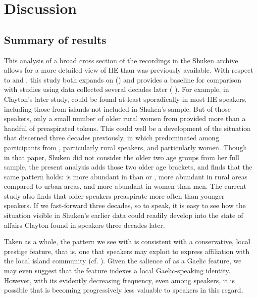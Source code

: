 \documentclass[output=paper,colorlinks,citecolor=brown]{langscibook}
\begin{document}
\section{Discussion}\label{discussion}

\subsection{Summary of results}

This analysis of a broad cross section of the recordings in the Shuken archive allows for a more detailed view of HE than was previously available. With respect to  and , this study both expands on \citeauthor{Shuken:1984} (\citeyear{Shuken:1984, Shuken:1985, Shuken:1986}) and provides a baseline for comparison with studies using data collected several decades later (\citeauthor{Clayton:2015} \citeyear{Clayton:2015, Clayton:2017, Clayton:2018}). For example, in Clayton’s later study,  could be found at least sporadically in most HE speakers, including those from islands not included in Shuken’s sample. But of those speakers, only a small number of older rural women from  provided more than a handful of preaspirated tokens. This could well be a development of the situation that \citet{Shuken:1985} discerned three decades previously, in which  predominated among participants from , particularly rural speakers, and particularly women. Though in that paper, Shuken did not consider the older two age groups from her full sample, the present analysis adds those two older age brackets, and finds that the same pattern holds:  is more abundant in  than  or , more abundant in rural areas compared to urban areas, and more abundant in women than men. The current study also finds that older speakers preaspirate more often than younger speakers. If we fast-forward three decades, so to speak, it is easy to see how the situation visible in Shuken’s earlier data could readily develop into the state of affairs Clayton found in speakers three decades later.

Taken as a whole, the pattern we see with  is consistent with a conservative, local prestige feature, that is, one that speakers may exploit to express affiliation with the local island community (cf. \citealt{Labov:1963}). Given the salience of  as a Gaelic feature, we may even suggest that the feature indexes a local Gaelic-speaking identity. However, with its evidently decreasing frequency, even among  speakers, it is possible that  is becoming progressively less valuable to speakers in this regard.
\end{document}
